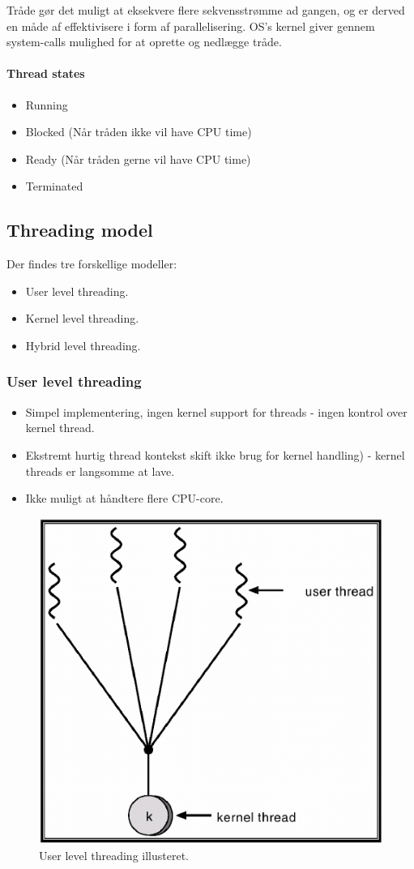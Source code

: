 Tråde gør det muligt at eksekvere flere sekvensstrømme ad gangen, og er derved en måde af effektivisere i form af parallelisering. OS's kernel giver gennem system-calls mulighed for at oprette og nedlægge tråde.

\paragraph{Thread states}
\begin{itemize}
	\item Running
	\item Blocked (Når tråden ikke vil have CPU time)
	\item Ready (Når tråden gerne vil have CPU time)
	\item Terminated
\end{itemize}


\subsection{Threading model}
Der findes tre forskellige modeller:

\begin{itemize}
	\item User level threading.
	\item Kernel level threading.
	\item Hybrid level threading.
\end{itemize}

\subsubsection{User level threading}
\begin{itemize}
	\item Simpel implementering, ingen kernel support for threads - ingen kontrol over kernel thread.
	\item Ekstremt hurtig thread kontekst skift ikke brug for kernel handling) - kernel threads er langsomme at lave.
	\item Ikke muligt at håndtere flere CPU-core.
\end{itemize}

\begin{figure}[H]
	\centering
	\includegraphics[width=0.5\linewidth]{figs/spm1/userthreads}
	\caption{User level threading illusteret.}
	\label{fig:userthreads}
\end{figure}

